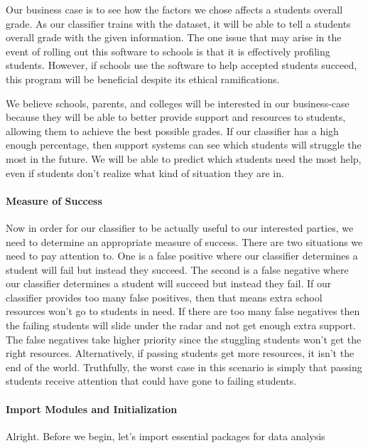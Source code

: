 \documentclass[11pt]{article}
\begin{document}
Our business case is to see how the factors we chose affects a students
overall grade. As our classifier trains with the dataset, it will be
able to tell a students overall grade with the given information. The
one issue that may arise in the event of rolling out this software to
schools is that it is effectively profiling students. However, if
schools use the software to help accepted students succeed, this program
will be beneficial despite its ethical ramifications.

We believe schools, parents, and colleges will be interested in our
business-case because they will be able to better provide support and
resources to students, allowing them to achieve the best possible
grades. If our classifier has a high enough percentage, then support
systems can see which students will struggle the most in the future. We
will be able to predict which students need the most help, even if
students don't realize what kind of situation they are in.

    \paragraph{Measure of Success}\label{measure-of-success}

Now in order for our classifier to be actually useful to our interested
parties, we need to determine an appropriate measure of success. There
are two situations we need to pay attention to. One is a false positive
where our classifier determines a student will fail but instead they
succeed. The second is a false negative where our classifier determines
a student will succeed but instead they fail. If our classifier provides
too many false positives, then that means extra school resources won't
go to students in need. If there are too many false negatives then the
failing students will slide under the radar and not get enough extra
support. The false negatives take higher priority since the stuggling
students won't get the right resources. Alternatively, if passing
students get more resources, it isn't the end of the world. Truthfully,
the worst case in this scenario is simply that passing students receive
attention that could have gone to failing students.

    \paragraph{Import Modules and
Initialization}\label{import-modules-and-initialization}

Alright. Before we begin, let's import essential packages for data
analysis
\end{document}
